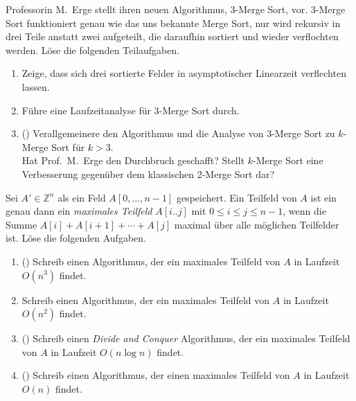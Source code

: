 \documentclass{uebung_cs}
\begin{document}
\begin{aufgabe}
	Professorin M.\ Erge stellt ihren neuen Algorithmus, 3-Merge Sort, vor.
	3-Merge Sort funktioniert genau wie das uns bekannte Merge Sort, nur wird rekursiv in drei Teile anstatt zwei aufgeteilt, die daraufhin sortiert und wieder verflochten werden.
	Löse die folgenden Teilaufgaben.
	\begin{enumerate}
		\item Zeige, dass sich drei sortierte Felder in asymptotischer Linearzeit verflechten lassen.
		\item Führe eine Laufzeitanalyse für 3-Merge Sort durch.
		\item (\hard) Verallgemeinere den Algorithmus und die Analyse von 3-Merge Sort zu $k$-Merge Sort für $k>3$.\\
		Hat Prof.\ M.\ Erge den Durchbruch geschafft?
		Stellt $k$-Merge Sort eine Verbesserung gegenüber dem klassischen 2-Merge Sort dar?
	\end{enumerate}
\end{aufgabe}

\begin{aufgabe}
	Sei $A' \in \mathbb{Z}^n$ als ein Feld $A[0, \dots, n-1]$ gespeichert.
	Ein Teilfeld von $A$ ist ein genau dann ein \textit{maximales Teilfeld} $A[i..j]$ mit $0\leq i\leq j\leq n-1$, wenn die Summe $A[i] + A[i+1] + \cdots + A[j]$ maximal über alle möglichen Teilfelder ist.
	Löse die folgenden Aufgaben.
	\begin{enumerate}
		\item (\warmup) Schreib einen Algorithmus, der ein maximales Teilfeld von $A$ in Laufzeit $O(n^3)$ findet.
		\item Schreib einen Algorithmus, der ein maximales Teilfeld von $A$ in Laufzeit $O(n^2)$ findet.
		\item (\hard) Schreib einen \textit{Divide and Conquer} Algorithmus, der ein maximales Teilfeld von $A$ in Laufzeit $O(n\log n)$ findet.
		\item (\veryhard) Schreib einen Algorithmus, der einen maximales Teilfeld von $A$ in Laufzeit $O(n)$ findet.
	\end{enumerate}
\end{aufgabe}
\end{document}
